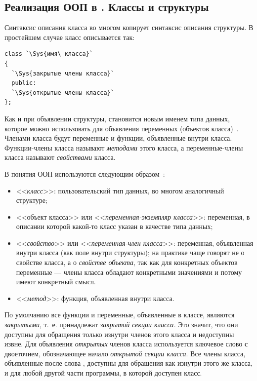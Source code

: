 \subsection[Реализация ООП в \Sys{C++}. Классы и структуры]{Реализация ООП в . Классы и структуры}
Синтаксис описания класса во многом копирует синтаксис описания структуры. В простейшем случае класс описывается  так:
\begin{lstlisting}
class `\Sys{имя\_класса}` 
{
  `\Sys{закрытые члены класса}`
  public:
  `\Sys{открытые члены класса}`
};
\end{lstlisting}

Как и при объявлении структуры,  становится новым именем типа данных, которое можно
использовать для объявления переменных (объектов класса)~\cite{OOP,OOPz}. %
Членами класса будут переменные и функции, объявленные
внутри класса. Функции-члены класса называют \emph{методами} этого класса, а переменные-члены класса
называют \emph{свойствами} класса.

В  понятия ООП используются следующим образом~\cite{OOP,OOPz}: %

\begin{itemize}
\item <<\emph{класс}>>: пользовательский тип данных, во многом аналогичный  структуре;
\item <<объект класса>> или <<\emph{переменная-экземпляр класса}>>: переменная, в описании которой какой-то
класс указан в качестве типа данных;
\item {}<<\emph{свойство}>> или <<\emph{переменная-член класса}>>: переменная, объявленная внутри класса (как поле внутри структуры);
на практике чаще говорят не о свойстве класса, а о \emph{свойстве объекта}, так как для конкретных
объектов переменные --- члены класса обладают конкретными значениями и потому имеют конкретный смысл.
\item <<\emph{метод}>>: функция, объявленная внутри класса.
\end{itemize}
По умолчанию все функции и переменные, объявленные в классе, являются \emph{закрытыми}, т.~е. принадлежат
\emph{закрытой секции класса.} Это значит, что они доступны для обращения только изнутри членов этого класса и
недоступны извне. Для объявления \emph{открытых} членов класса используется ключевое слово
 с двоеточием, обозначающее начало \emph{открытой секции класса}. Все члены
класса, объявленные после слова , доступны для обращения как изнутри этого же класса, и для
любой другой части программы, в которой доступен класс. 

